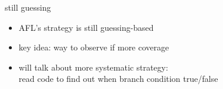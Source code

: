 \begin{frame}{still guessing}
\begin{itemize}
\item AFL's strategy is still guessing-based
\item key idea: way to observe if more coverage
\vspace{.5cm}
\item will talk about more systematic strategy: \\
read code to find out when branch condition true/false
\end{itemize}
\end{frame}
